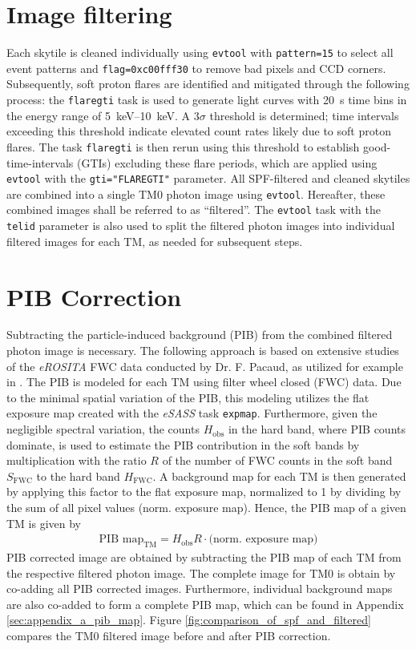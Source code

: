 \section{Image filtering}
Each skytile is cleaned individually using \texttt{evtool} with \texttt{pattern=15} to select all event patterns and \texttt{flag=0xc00fff30} to remove bad pixels and CCD corners. Subsequently, soft proton flares are identified and mitigated through the following process: the \texttt{flaregti} task is used to generate light curves with \SI{20}{\second} time bins in the energy range of \SIrange{5}{10}{\kilo\electronvolt}. A \(3\sigma\) threshold is determined; time intervals exceeding this threshold indicate elevated count rates likely due to soft proton flares. The task \texttt{flaregti} is then rerun using this threshold to establish good-time-intervals (GTIs) excluding these flare periods, which are applied using \texttt{evtool} with the \texttt{gti="FLAREGTI"} parameter. All SPF-filtered and cleaned skytiles are combined into a single TM0 photon image using \texttt{evtool}. Hereafter, these combined images shall be referred to as \enquote{filtered}. The \texttt{evtool} task with the \texttt{telid} parameter is also used to split the filtered photon images into individual filtered images for each TM, as needed for subsequent steps.
%
\section{PIB Correction}
Subtracting the particle-induced background (PIB) from the combined filtered photon image is necessary. The following  approach is based on extensive studies of the \textit{eROSITA} FWC data conducted by Dr. F. Pacaud, as utilized for example in \cite{Reiprich2021}.  The PIB is modeled for each TM using filter wheel closed (FWC) data. Due to the minimal spatial variation of the PIB, this modeling utilizes the flat exposure map created with the \textit{eSASS} task \texttt{expmap}. Furthermore, given the negligible spectral variation, the counts \(H_\text{obs}\) in the hard band, where PIB counts dominate, is used to estimate the PIB contribution in the soft bands by multiplication with the ratio \(R\) of the number of FWC counts in the soft band \(S_{\text{FWC}}\) to the hard band \(H_\text{FWC}\). A background map for each TM is then generated by applying this factor to the flat exposure map, normalized to 1 by dividing by the sum of all pixel values (norm. exposure map). Hence, the PIB map of a given TM is given by
\begin{align*}
    \text{PIB map}_\text{TM} = H_\text{obs}R\cdot\bigl(\text{norm. exposure map}\bigr)
\end{align*}
PIB corrected image are obtained by subtracting the PIB map of each TM from the respective filtered photon image. The complete image for TM0 is obtain by co-adding all PIB corrected images. Furthermore, individual background maps are also co-added to form a complete PIB map, which can be found in Appendix \ref{sec:appendix_a_pib_map}. Figure \ref{fig:comparison_of_spf_and_filtered} compares the TM0 filtered image before and after PIB correction.
%

